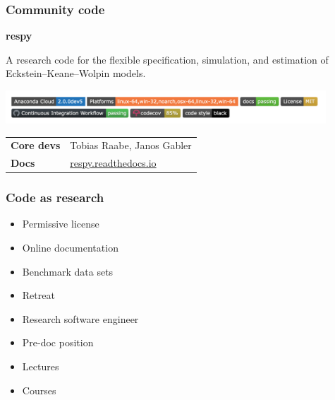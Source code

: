\begin{frame}\frametitle{Community code}

\vspace{0.3cm}\textbf{\hspace{0.05cm} {\Large respy}}\vspace{0.50cm}

A research code for the flexible specification, simulation, and estimation of Eckstein--Keane--Wolpin models.\\\vspace{0.45cm}

\includegraphics[width=0.9\textwidth]{material/crop-respy-engineering.png}\\\vspace{0.50cm}

\hspace{-0.2cm}\begin{tabular}{ll}
\textbf{Core devs} & Tobias Raabe, Janos Gabler\\
\textbf{Docs}      & \url{respy.readthedocs.io}
\end{tabular}

\end{frame}
\begin{frame}\frametitle{Code as research}


  \begin{multicols}{2}
    \vspace{0.3cm}
    \begin{itemize}\setlength\itemsep{1em}
      \item Permissive license
      \item Online documentation
      \item Benchmark data sets
      \item Retreat
    \end{itemize}

    \pause

    \vspace{0.3cm}
    \begin{itemize}\setlength\itemsep{1em}
      \item Research software engineer
      \item Pre-doc position
      \item Lectures
      \item Courses
  \end{itemize}
  \end{multicols}

\end{frame}
